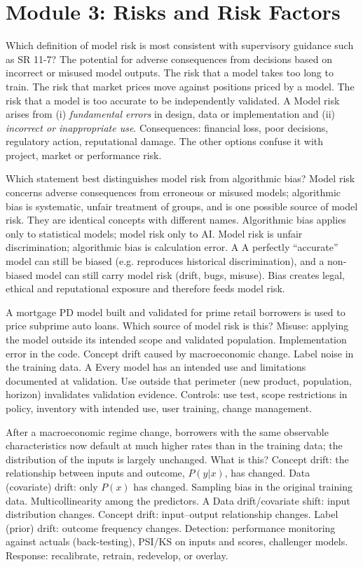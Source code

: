 


\section{Module 3: Risks and Risk Factors}

{Which definition of model risk is most consistent with supervisory guidance such as SR 11-7?}
{The potential for adverse consequences from decisions based on incorrect or misused model outputs.}
{The risk that a model takes too long to train.}
{The risk that market prices move against positions priced by a model.}
{The risk that a model is too accurate to be independently validated.}
{A}
{Model risk arises from (i) \emph{fundamental errors} in design, data or implementation and (ii) \emph{incorrect or inappropriate use}. Consequences: financial loss, poor decisions, regulatory action, reputational damage. The other options confuse it with project, market or performance risk.}

{Which statement best distinguishes model risk from algorithmic bias?}
{Model risk concerns adverse consequences from erroneous or misused models; algorithmic bias is systematic, unfair treatment of groups, and is one possible source of model risk.}
{They are identical concepts with different names.}
{Algorithmic bias applies only to statistical models; model risk only to AI.}
{Model risk is unfair discrimination; algorithmic bias is calculation error.}
{A}
{A perfectly ``accurate'' model can still be biased (e.g. reproduces historical discrimination), and a non-biased model can still carry model risk (drift, bugs, misuse). Bias creates legal, ethical and reputational exposure and therefore feeds model risk.}

{A mortgage PD model built and validated for prime retail borrowers is used to price subprime auto loans. Which source of model risk is this?}
{Misuse: applying the model outside its intended scope and validated population.}
{Implementation error in the code.}
{Concept drift caused by macroeconomic change.}
{Label noise in the training data.}
{A}
{Every model has an intended use and limitations documented at validation. Use outside that perimeter (new product, population, horizon) invalidates validation evidence. Controls: use test, scope restrictions in policy, inventory with intended use, user training, change management.}

{After a macroeconomic regime change, borrowers with the same observable characteristics now default at much higher rates than in the training data; the distribution of the inputs is largely unchanged. What is this?}
{Concept drift: the relationship between inputs and outcome, $P(y|x)$, has changed.}
{Data (covariate) drift: only $P(x)$ has changed.}
{Sampling bias in the original training data.}
{Multicollinearity among the predictors.}
{A}
{Data drift/covariate shift: input distribution changes. Concept drift: input--output relationship changes. Label (prior) drift: outcome frequency changes. Detection: performance monitoring against actuals (back-testing), PSI/KS on inputs and scores, challenger models. Response: recalibrate, retrain, redevelop, or overlay.}


